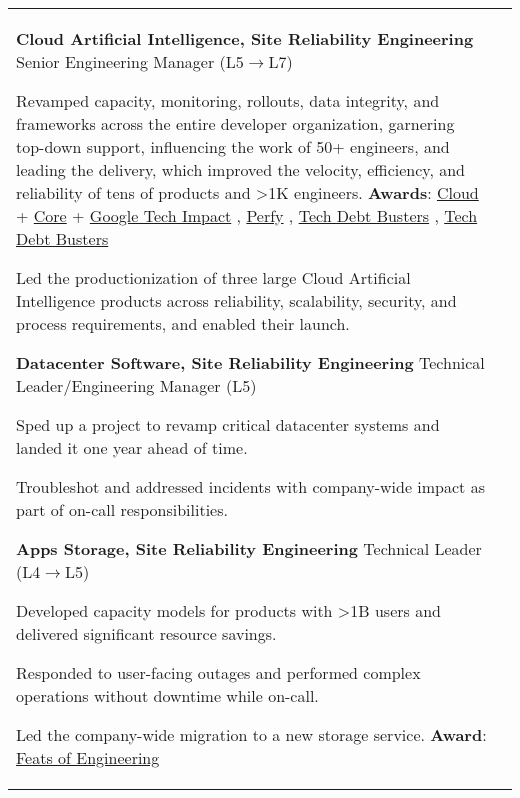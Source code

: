 \documentclass[letterpaper,10pt,oneside]{article}
\newcommand{\itemspacing}{\vspace{0.12cm}}
\newcommand{\sref}[2]{%
    \href{https://0/local/attachments/#1}{\textcolor{hiddenblue}{#2}}%
}
\newenvironment{body}
{\par\par
\begin{longtable}{p{0.145\textwidth}p{0.81\textwidth}}}
{\par\end{longtable}\par}
\begin{document}
\begin{body}
\phantom{g}\textbf{Cloud Artificial Intelligence, Site Reliability Engineering} \textemdash{ }Senior Engineering Manager (L5$\rightarrow$L7)
\begin{comp}
\item Revamped capacity, monitoring, rollouts, data integrity, and frameworks across the entire developer organization, garnering top-down support, influencing the work of 50+ engineers, and leading the delivery, which improved the velocity, efficiency, and reliability of tens of products and >1K engineers. \textbf{Awards}: \sref{Google-Award-GoogleCloudTechImpact-2022.pdf}{Cloud} + \sref{Google-Award-CoreTechImpact-2021.pdf}{Core} + \sref{Google-Award-GoogleTechImpact-2022.pdf}{Google Tech Impact}, \sref{Google-Award-Perfy.pdf}{Perfy}, \sref{Google-Award-TechDebtBusters1.pdf}{Tech Debt Busters}, \sref{Google-Award-TechDebtBusters2.pdf}{Tech Debt Busters}
\item Led the productionization of three large Cloud Artificial Intelligence products across reliability, scalability, security, and process requirements, and enabled their launch.
\end{comp}
\itemspacing

\phantom{g}\textbf{Datacenter Software, Site Reliability Engineering} \textemdash{ }Technical Leader/Engineering Manager (L5)
\begin{comp}
\item Sped up a project to revamp critical datacenter systems and landed it one year ahead of time.
\item Troubleshot and addressed incidents with company-wide impact as part of on-call responsibilities.
\end{comp}
\itemspacing

\phantom{g}\textbf{Apps Storage, Site Reliability Engineering} \textemdash{ }Technical Leader (L4$\rightarrow$L5)
\begin{comp}
\item Developed capacity models for products with >1B users and delivered significant resource savings.
\item Responded to user-facing outages and performed complex operations without downtime while on-call.
\item Led the company-wide migration to a new storage service. \textbf{Award}:\hspace{0.1cm}\sref{Google-Award-FeatsOfEngineering-2018.pdf}{Feats of Engineering}
\end{comp}
\itemspacing



\end{body}
\end{document}
